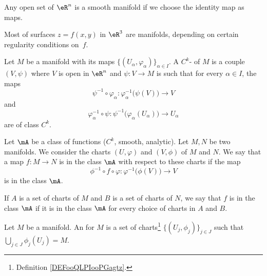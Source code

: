 \begin{example}
	Any open set of $\eR^n$ is a smooth manifold if we choose the identity map as maps.
\end{example}

Most of surfaces $z=f(x,y)$ in $\eR^3$ are manifolds, depending on certain regularity conditions on~$f$.

\begin{definition}       \label{DEFooQLPIooPGagtz}
	Let \( M\) be a manifold with its maps \(  \{ (U_{\alpha}, \varphi_{\alpha}) \}_{\alpha\in I}   \). A \( C^k\)- of \( M\) is a couple \( (V,\psi)\) where \( V\) is open in \( \eR^n\) and \( \psi\colon V\to M\) is such that for every \( \alpha\in I\), the maps
	\begin{equation}
		\psi^{-1}\circ \varphi_{\alpha}\colon \varphi_{\alpha}^{-1}\big( \psi(V) \big)\to V
	\end{equation}
	and
	\begin{equation}
		\varphi_{\alpha}^{-1}\circ \psi\colon \psi^{-1}\big( \varphi_{\alpha}(U_{\alpha}) \big)\to U_{\alpha}
	\end{equation}
	are of class \( C^k\).
\end{definition}

\begin{definition}       \label{DEFooUFHTooTXUVpN}
	Let \( \mA\) be a class of functions (\( C^k\), smooth, analytic). Let \( M,N\) be two manifolds. We consider the charts \( (U,\varphi)\) and \( (V,\phi)\) of \( M\) and \( N\). We say that a map \(f\colon M\to N \) is in the class \( \mA\) with respect to these charts if the map
	\begin{equation}
		\phi^{-1}\circ f\circ\varphi\colon \varphi^{-1}\big( \phi(V) \big)\to V
	\end{equation}
	is in the class \( \mA\).

	If \( A\) is a set of charts of \( M\) and \( B\) is a set of charts of \( N\), we say that \( f\) is in the class \( \mA\) if it is in the class \( \mA\) for every choice of charts in \( A\) and \( B\).
\end{definition}

\begin{definition}       \label{DEFooMLNQooEgEfdq}
	Let \( M\) be a manifold. An  for \( M\) is a set of charts\footnote{Definition \ref{DEFooQLPIooPGagtz}.} \( \{  (U_j,\phi_j)  \}_{j\in J}\) such that \( \bigcup_{j\in J}\phi_j(U_j)=M\).
\end{definition}

